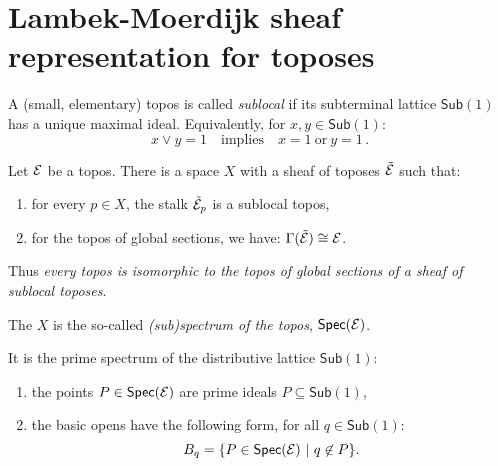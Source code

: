 \documentclass[lambek.tex]{subfiles}
\begin{document}
\section{Lambek-Moerdijk sheaf representation for toposes}

\begin{definition} A  (small, elementary)  topos is called \emph{sublocal} if its subterminal lattice $\mathsf{Sub}(1)$ has a unique maximal ideal.
Equivalently, for $x,y\in \mathsf{Sub}(1)$: 
\[
x\vee y = 1\quad\text{implies}\quad x=1\ \text{or}\ y=1\,.
\]
\end{definition}
%
\begin{theorem}
Let $\mathcal{E}$ be a topos.  There is a space $X$ with a sheaf of toposes $\tilde{\mathcal{E}}$ such that:
\begin{enumerate}
\item for every $p\in X$, the stalk $\tilde{\mathcal{E}}_p$ is a sublocal topos, 
\item for the topos of global sections, we have: $\Gamma(\tilde{\mathcal{E}}) \cong \mathcal{E}$.
\end{enumerate}
Thus \emph{every topos is isomorphic to the topos of global sections of a sheaf of sublocal toposes}.
\end{theorem}


The  $X$ is the so-called \emph{(sub)spectrum of the topos},  $\mathsf{Spec}(\mathcal{E})$.\\  
\medskip

It is the prime spectrum of the distributive lattice $\mathsf{Sub}(1)$:
 \begin{enumerate}
\item the points $P\in \mathsf{Spec}(\mathcal{E})$ are prime ideals $P\subseteq \mathsf{Sub}(1)$,
\item the basic opens have the following form, for all $q\in\mathsf{Sub}(1)$:
$$B_q = \{ P\in \mathsf{Spec}(\E)\ |\ q\not\in P \}.$$
\end{enumerate}
\end{document}
